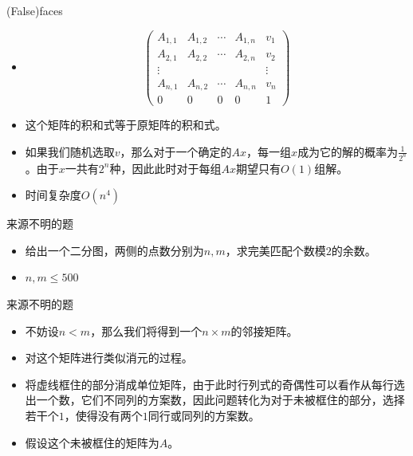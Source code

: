 \documentclass{beamer}
\begin{document}
\begin{frame}{(False)faces}
    \begin{itemize}
        \item $$\left(\begin{matrix}
            A_{1,1} & A_{1,2} & \cdots & A_{1, n} & v_1 \\
            A_{2,1} & A_{2,2} & \cdots & A_{2, n} & v_2 \\
            \vdots  &         &        &          & \vdots\\
            A_{n,1} & A_{n,2} & \cdots & A_{n, n} & v_n \\
            0       & 0       & 0      & 0        & 1
        \end{matrix}\right)$$
        \item 这个矩阵的积和式等于原矩阵的积和式。
        \item 如果我们随机选取$v$，那么对于一个确定的$Ax$，每一组$x$成为它的解的概率为$\frac{1}{2^n}$。由于$x$一共有$2^n$种，因此此时对于每组$Ax$期望只有$O(1)$组解。
        \item 时间复杂度$O(n^4)$
    \end{itemize}
\end{frame}

\begin{frame}{来源不明的题}
    \begin{itemize}
        \item 给出一个二分图，两侧的点数分别为$n, m$，求完美匹配个数模$2$的余数。
        \item $n,m\leq 500$
    \end{itemize}
\end{frame}

\begin{frame}{来源不明的题}
    \begin{itemize}
        \item 不妨设$n<m$，那么我们将得到一个$n\times m$的邻接矩阵。
        \item 对这个矩阵进行类似消元的过程。\newline
        \begin{center}
        \end{center}
        \item 将虚线框住的部分消成单位矩阵，由于此时行列式的奇偶性可以看作从每行选出一个数，它们不同列的方案数，因此问题转化为对于未被框住的部分，选择若干个$1$，使得没有两个$1$同行或同列的方案数。
        \item 假设这个未被框住的矩阵为$A$。
    \end{itemize}
\end{frame}
\end{document}
